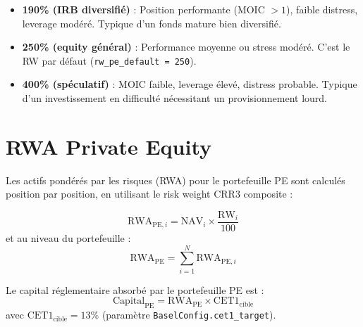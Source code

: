 \documentclass[12pt,a4paper]{article}
\begin{document}
\begin{interpretbox}
\begin{itemize}[nosep]
    \item \textbf{190\% (IRB diversifi\'{e})} : Position performante (MOIC $> 1$), faible distress,
          leverage mod\'{e}r\'{e}. Typique d'un fonds mature bien diversifi\'{e}.
    \item \textbf{250\% (equity g\'{e}n\'{e}ral)} : Performance moyenne ou stress mod\'{e}r\'{e}.
          C'est le RW par d\'{e}faut (\texttt{rw\_pe\_default = 250}).
    \item \textbf{400\% (sp\'{e}culatif)} : MOIC faible, leverage \'{e}lev\'{e}, distress probable.
          Typique d'un investissement en difficult\'{e} n\'{e}cessitant un provisionnement lourd.
\end{itemize}
\end{interpretbox}


\section{RWA Private Equity}
\label{sec:rwa}

Les actifs pond\'{e}r\'{e}s par les risques (RWA) pour le portefeuille PE sont calcul\'{e}s
position par position, en utilisant le risk weight CRR3 composite :

\begin{formulebox}
\begin{equation}
\label{eq:rwa_pe}
\mathrm{RWA}_{\mathrm{PE},i} = \mathrm{NAV}_i \times \frac{\mathrm{RW}_i}{100}
\end{equation}
et au niveau du portefeuille :
\begin{equation}
\mathrm{RWA}_{\mathrm{PE}} = \sum_{i=1}^{N} \mathrm{RWA}_{\mathrm{PE},i}
\end{equation}
\end{formulebox}

\begin{definitionbox}
Le capital r\'{e}glementaire absorb\'{e} par le portefeuille PE est :
\begin{equation}
\mathrm{Capital}_{\mathrm{PE}} = \mathrm{RWA}_{\mathrm{PE}} \times \mathrm{CET1}_{\mathrm{cible}}
\end{equation}
avec $\mathrm{CET1}_{\mathrm{cible}} = 13\%$ (param\`{e}tre \texttt{BaselConfig.cet1\_target}).
\end{definitionbox}
\end{document}
